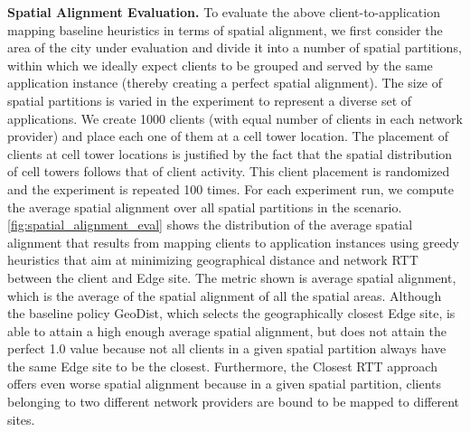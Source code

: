 \par \noindent \textbf{Spatial Alignment Evaluation. }To evaluate the above client-to-application mapping baseline heuristics in terms of spatial alignment, we first consider the area of the city under evaluation and divide it into a number of spatial partitions, within which we ideally expect clients to be grouped and served by the same application instance (thereby creating a perfect spatial alignment). The size of spatial partitions is varied in the experiment to represent a diverse set of applications. We create 1000 clients (with equal number of clients in each network provider) and place each one of them at a cell tower location. The placement of clients at cell tower locations is justified by the fact that the spatial distribution of cell towers follows that of client activity. This client placement is randomized and the experiment is repeated 100 times. For each experiment run, we compute the average spatial alignment over all spatial partitions in the scenario. \cref{fig:spatial_alignment_eval} shows the distribution of the average spatial alignment that results from mapping clients to application instances using greedy heuristics that aim at minimizing geographical distance and network RTT between the client and Edge site. The metric shown is average spatial alignment, which is the average of the spatial alignment of all the spatial areas. Although the baseline policy GeoDist, which selects the geographically closest Edge site, is able to attain a high enough average spatial alignment, but does not attain the perfect 1.0 value because not all clients in a given spatial partition always have the same Edge site to be the closest. Furthermore, the Closest RTT approach offers even worse spatial alignment because in a given spatial partition, clients belonging to two different network providers are bound to be mapped to different sites. 

